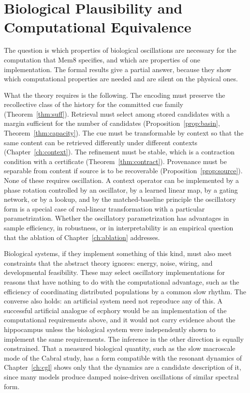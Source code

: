 \chapter{Biological Plausibility and Computational Equivalence}\label{ch:equivalence}

The question is which properties of biological oscillations are necessary for the computation that Mem8 specifies, and which are properties of one implementation. The formal results give a partial answer, because they show which computational properties are needed and are silent on the physical ones.

What the theory requires is the following. The encoding must preserve the recollective class of the history for the committed cue family (Theorem~\ref{thm:suff}). Retrieval must select among stored candidates with a margin sufficient for the number of candidates (Proposition~\ref{prop:basin}, Theorem~\ref{thm:capacity}). The cue must be transformable by context so that the same content can be retrieved differently under different contexts (Chapter~\ref{ch:context}). The refinement must be stable, which is a contraction condition with a certificate (Theorem~\ref{thm:contract}). Provenance must be separable from content if source is to be recoverable (Proposition~\ref{prop:source}). None of these requires oscillation. A context operator can be implemented by a phase rotation controlled by an oscillator, by a learned linear map, by a gating network, or by a lookup, and by the matched-baseline principle the oscillatory form is a special case of real-linear transformation with a particular parametrization. Whether the oscillatory parametrization has advantages in sample efficiency, in robustness, or in interpretability is an empirical question that the ablation of Chapter~\ref{ch:ablation} addresses.

Biological systems, if they implement something of this kind, must also meet constraints that the abstract theory ignores: energy, noise, wiring, and developmental feasibility. These may select oscillatory implementations for reasons that have nothing to do with the computational advantage, such as the efficiency of coordinating distributed populations by a common slow rhythm. The converse also holds: an artificial system need not reproduce any of this. A successful artificial analogue of ecphory would be an implementation of the computational requirements above, and it would not carry evidence about the hippocampus unless the biological system were independently shown to implement the same requirements. The inference in the other direction is equally constrained. That a measured biological quantity, such as the slow macroscale mode of the Cabral study, has a form compatible with the resonant dynamics of Chapter~\ref{ch:cgl} shows only that the dynamics are a candidate description of it, since many models produce damped noise-driven oscillations of similar spectral form.

